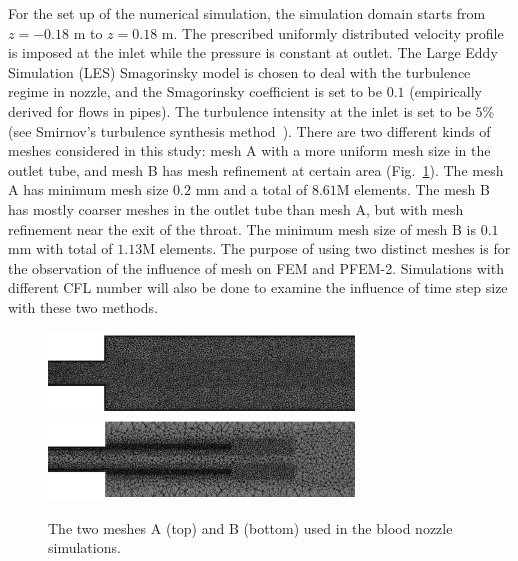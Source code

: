For the set up of the numerical simulation, the simulation domain starts from $z=-0.18$ m to $z=0.18$ m. The prescribed uniformly distributed velocity profile is imposed at the inlet while the pressure is constant at outlet. The Large Eddy Simulation (LES) Smagorinsky model is chosen to deal with the turbulence regime in nozzle, and the Smagorinsky coefficient is set to be $0.1$ (empirically derived for flows in pipes). The turbulence intensity at the inlet is set to be $5$\% (see Smirnov's turbulence synthesis method~\cite{Smirnov2001}). There are two different kinds of meshes considered in this study: mesh A with a more uniform mesh size in the outlet tube, and mesh B has mesh refinement at certain area (Fig.~\ref{fig:nozzlemesh}). The mesh A has minimum mesh size $0.2$ mm and a total of $8.61$M elements. The mesh B has mostly coarser meshes in the outlet tube than mesh A, but with mesh refinement near the exit of the throat. The minimum mesh size of mesh B is $0.1$ mm with total of $1.13$M elements. The purpose of using two distinct meshes is for the observation of the influence of mesh on FEM and PFEM-2. Simulations with different CFL number will also be done to examine the influence of time step size with these two methods.

\begin{figure}[htbp]
    \centering
    \includegraphics[width=3.2in]{imgs/nozzle_pump/nozzle_fmesh.pdf}
    \includegraphics[width=3.2in]{imgs/nozzle_pump/nozzle_pmesh.pdf}
    \caption{The two meshes A (top) and B (bottom) used in the blood nozzle simulations.}
    \label{fig:nozzlemesh}
\end{figure}


